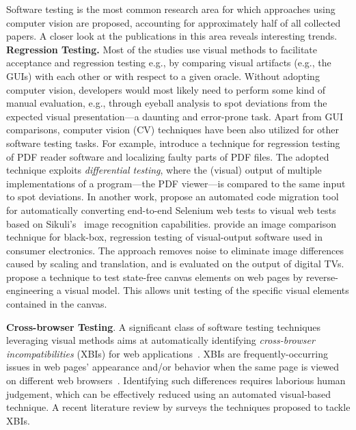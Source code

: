 Software testing is the most common research area 
for which approaches using computer vision are proposed, 
accounting for approximately half of all collected papers.
A closer look at the publications in this area reveals interesting trends. 
\textbf{Regression Testing.} Most of the studies use visual methods to facilitate acceptance and regression testing e.g., by 
comparing visual artifacts (e.g., the GUIs) 
with each other or with respect to a given oracle.
Without adopting computer vision, developers would most 
likely need to perform some kind of manual evaluation, 
e.g., through eyeball analysis to spot deviations from 
the expected visual presentation---a daunting and error-prone task.
Apart from GUI comparisons, computer vision (CV) techniques have been also utilized 
for other software testing tasks.
%
For example,
%
\citet{Kuchta-2018-EMSE} introduce a technique for regression 
testing of PDF reader software and localizing faulty parts of PDF files.
The adopted technique exploits \textit{differential testing}, 
where the (visual) output of multiple implementations of a 
program---the PDF viewer---is compared to the same input to spot deviations.
%
In another work, \citet{Leotta-2018-STVR} propose an automated 
code migration tool for automatically converting end-to-end 
Selenium web tests to visual web tests based on 
Sikuli's~\cite{Chang-2010-CHI} image recognition capabilities.
%
\citet{Kirac-2018-JSS} provide an image comparison technique 
for black-box, regression testing of visual-output software 
used in consumer electronics.
The approach removes noise to eliminate image differences 
caused by scaling and translation, and is evaluated on the output of digital TVs.
%
\citet{canvas_icst2018} propose a technique to test 
state-free canvas elements on web pages by reverse-engineering a visual model.
This allows unit testing of the specific visual elements contained in the canvas.


\textbf{Cross-browser Testing}. A significant class of software testing techniques leveraging visual methods aims at automatically identifying \textit{cross-browser incompatibilities} (XBIs) for web 
applications~\cite{Choudhary-2010-ICSM, Choudhary-2012-ICST,
Semenenko-2013-ICSM, Choudhary-2013-ICSE, Selay-2014-DICTA, He-2016-ICWS, Xu-2018-TOIT}.
XBIs are frequently-occurring issues in web pages' 
appearance and/or behavior when the same page is viewed 
on different web browsers~\cite{Choudhary-2013-ICSE}.
Identifying such differences requires laborious human judgement,
which can be effectively reduced using an automated visual-based technique.
A recent literature review by \citet{Sabaren-2018-JCST} 
surveys the techniques proposed to tackle XBIs.

